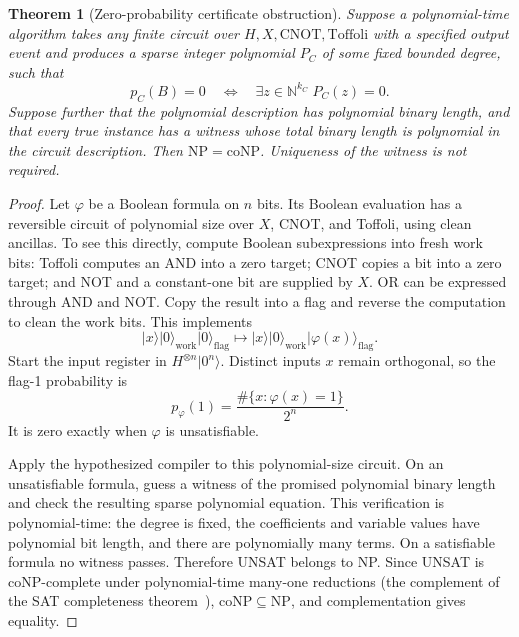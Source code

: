 \documentclass[11pt,letterpaper]{article}
\numberwithin{equation}{section}
\newtheorem{theorem}{Theorem}[section]
\theoremstyle{definition}
\theoremstyle{remark}
\newcommand{\N}{\mathbb N}
\newcommand{\ket}[1]{\lvert #1\rangle}
\begin{document}
\begin{theorem}[Zero-probability certificate obstruction]
\label{pqc:cc:thm:npconp}
Suppose a polynomial-time algorithm takes any finite circuit over
$H,X,\mathrm{CNOT},\mathrm{Toffoli}$ with a specified output event and produces a
sparse integer polynomial $P_C$ of some fixed bounded degree, such that
\[
 p_C(B)=0\quad\Longleftrightarrow\quad
 \exists z\in\N^{k_C}\;P_C(z)=0.
\]
Suppose further that the polynomial description has polynomial binary length,
and that every true instance has a witness whose total binary length is
polynomial in the circuit description. Then $\mathrm{NP}=\mathrm{coNP}$.
Uniqueness of the witness is not required.
\end{theorem}
\begin{proof}
Let $\varphi$ be a Boolean formula on $n$ bits. Its Boolean evaluation has a
reversible circuit of polynomial size over $X$, CNOT, and Toffoli, using clean
ancillas. To see this directly, compute Boolean subexpressions into fresh
work bits: Toffoli computes an AND into a zero target; CNOT copies a bit into
a zero target; and NOT and a constant-one bit are supplied by $X$. OR can be
expressed through AND and NOT. Copy the result into a flag and reverse the
computation to clean the work bits. This implements
\[
 \ket x\ket{0}_{\mathrm{work}}\ket0_{\mathrm{flag}}
 \longmapsto
 \ket x\ket{0}_{\mathrm{work}}\ket{\varphi(x)}_{\mathrm{flag}}.
\]
Start the input register in $H^{\otimes n}\ket{0^n}$. Distinct inputs $x$
remain orthogonal, so the flag-1 probability is
\begin{equation}
 p_\varphi(1)=\frac{\#\{x:\varphi(x)=1\}}{2^n}.
\label{pqc:cc:eq:satprob}
\end{equation}
It is zero exactly when $\varphi$ is unsatisfiable.

Apply the hypothesized compiler to this polynomial-size circuit. On an
unsatisfiable formula, guess a witness of the promised polynomial binary
length and check the resulting sparse polynomial equation. This verification
is polynomial-time: the degree is fixed, the coefficients and variable values
have polynomial bit length, and there are polynomially many terms. On a
satisfiable formula no witness passes. Therefore UNSAT belongs to NP.
Since UNSAT is coNP-complete under polynomial-time many-one reductions
(the complement of the SAT completeness theorem~\cite{b62s10-Cook}),
$\mathrm{coNP}\subseteq\mathrm{NP}$, and complementation gives equality.
\end{proof}
\end{document}
